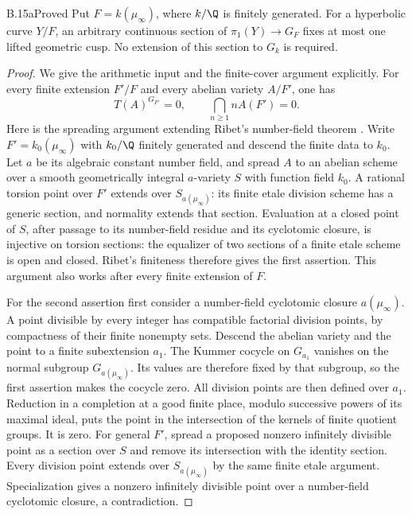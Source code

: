 \begin{claim}{B.15a}{Proved}
Put $F=k(\mu_\infty)$, where $k/\Q$ is finitely generated. For a
hyperbolic curve $Y/F$, an arbitrary continuous section of
$\pi_1(Y)\to G_F$ fixes at most one lifted geometric cusp. No extension
of this section to $G_k$ is required.
\end{claim}
\begin{proof}
We give the arithmetic input and the finite-cover argument explicitly.
For every finite extension $F'/F$ and every abelian variety $A/F'$, one has
\[
 T(A)^{G_{F'}}=0,\qquad \bigcap_{n\ge1}nA(F')=0.
\]
Here is the spreading argument extending Ribet's number-field theorem
\citep[Appendix, Theorem 1]{BC_KatzLang}. Write
$F'=k_0(\mu_\infty)$ with $k_0/\Q$ finitely generated and descend the
finite data to $k_0$. Let $a$ be its algebraic constant number field, and
spread $A$ to an abelian scheme over a smooth geometrically integral
$a$-variety $S$ with function field $k_0$. A rational torsion point over
$F'$ extends over $S_{a(\mu_\infty)}$: its finite etale division scheme
has a generic section, and normality extends that section. Evaluation at
a closed point of $S$, after passage to its number-field residue and its
cyclotomic closure, is injective on torsion sections: the equalizer of two
sections of a finite etale scheme is open and closed. Ribet's finiteness
therefore gives the first assertion. This argument also works after every
finite extension of $F$.

For the second assertion first consider a number-field cyclotomic closure
$a(\mu_\infty)$. A point divisible by every integer has compatible
factorial division points, by compactness of their finite nonempty sets.
Descend the abelian variety and the point to a finite subextension $a_1$.
The Kummer cocycle on $G_{a_1}$ vanishes on the normal subgroup
$G_{a(\mu_\infty)}$. Its values are therefore fixed by that subgroup,
so the first assertion makes the cocycle zero. All division points are
then defined over $a_1$. Reduction in a completion at a good finite place,
modulo successive powers of its maximal ideal, puts the point in the
intersection of the kernels of finite quotient groups. It is zero.
For general $F'$, spread a proposed nonzero infinitely divisible point as
a section over $S$ and remove its intersection with the identity section.
Every division point extends over $S_{a(\mu_\infty)}$ by the same finite
etale argument. Specialization gives a nonzero infinitely divisible point
over a number-field cyclotomic closure, a contradiction.


\end{proof}
